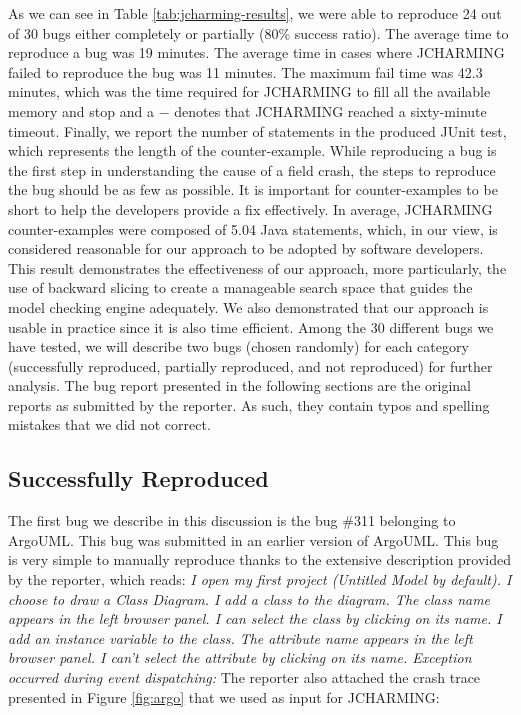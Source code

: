 \documentclass[12pt]{report}
\begin{document}
As we can see in Table \ref{tab:jcharming-results}, we were able to
reproduce 24 out of 30 bugs either completely or partially (80\% success
ratio). The average time to reproduce a bug was 19 minutes. The average
time in cases where JCHARMING failed to reproduce the bug was 11
minutes. The maximum fail time was 42.3 minutes, which was the time
required for JCHARMING to fill all the available memory and stop and a
\(-\) denotes that JCHARMING reached a sixty-minute timeout. Finally, we
report the number of statements in the produced JUnit test, which
represents the length of the counter-example. While reproducing a bug is
the first step in understanding the cause of a field crash, the steps to
reproduce the bug should be as few as possible. It is important for
counter-examples to be short to help the developers provide a fix
effectively. In average, JCHARMING counter-examples were composed of
5.04 Java statements, which, in our view, is considered reasonable for
our approach to be adopted by software developers. This result
demonstrates the effectiveness of our approach, more particularly, the
use of backward slicing to create a manageable search space that guides
the model checking engine adequately. We also demonstrated that our
approach is usable in practice since it is also time efficient. Among
the 30 different bugs we have tested, we will describe two bugs (chosen
randomly) for each category (successfully reproduced, partially
reproduced, and not reproduced) for further analysis. The bug report
presented in the following sections are the original reports as
submitted by the reporter. As such, they contain typos and spelling
mistakes that we did not correct.

\subsection{Successfully Reproduced}\label{successfully-reproduced}

The first bug we describe in this discussion is the bug \#311 belonging
to ArgoUML. This bug was submitted in an earlier version of ArgoUML.
This bug is very simple to manually reproduce thanks to the extensive
description provided by the reporter, which reads: \emph{I open my first
project (Untitled Model by default). I choose to draw a Class Diagram. I
add a class to the diagram. The class name appears in the left browser
panel. I can select the class by clicking on its name. I add an instance
variable to the class. The attribute name appears in the left browser
panel. I can't select the attribute by clicking on its name. Exception
occurred during event dispatching:} The reporter also attached the crash
trace presented in Figure \ref{fig:argo} that we used as input for
JCHARMING:
\end{document}
